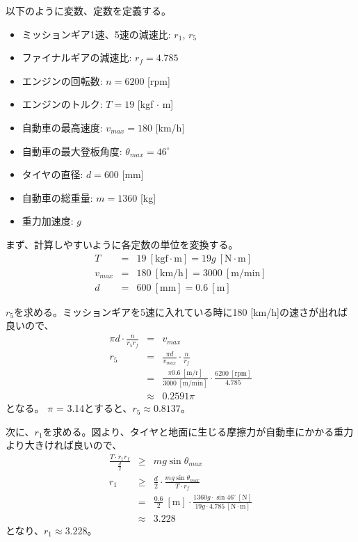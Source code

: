 \documentclass[titlepage]{jsarticle}
\begin{document}
以下のように変数、定数を定義する。
\begin{itemize}
  \item ミッションギア1速、5速の減速比: $r_1$, $r_5$
  \item ファイナルギアの減速比: $r_f = 4.785$
  \item エンジンの回転数: $n = 6200$ [rpm]
  \item エンジンのトルク: $T = 19$ [kgf $\cdot$ m]
  \item 自動車の最高速度: $v_{max} = 180$ [km/h]
  \item 自動車の最大登板角度: $\theta_{max} = 46^\circ$
  \item タイヤの直径: $d = 600$ [mm]
  \item 自動車の総重量: $m = 1360$ [kg]
  \item 重力加速度: $g$
\end{itemize}

まず、計算しやすいように各定数の単位を変換する。
\begin{eqnarray*}
  T &=& 19 \ [\mathrm{kgf \cdot m}] = 19g \ [\mathrm{N \cdot m}] \\
  v_{max} &=& 180 \ [\mathrm{km/h}] = 3000 \ [\mathrm{m/min}] \\
  d &=& 600 \ [\mathrm{mm}] = 0.6 \ [\mathrm m]
\end{eqnarray*}

$r_5$を求める。ミッションギアを5速に入れている時に180 [km/h]の速さが出れば良いので、
\begin{eqnarray*}
  \pi d \cdot \frac{n}{r_5r_f} &=& v_{max} \\
  r_5 &=& \frac{\pi d}{v_{max}} \cdot \frac{n}{r_f} \\
  &=& \frac{\pi 0.6 \ [\mathrm{m/r}]}{3000 \ [\mathrm{m/min}]} \cdot \frac{6200 \ [\mathrm{rpm}]}{4.785} \\
  &\approx& 0.2591 \pi
\end{eqnarray*}
となる。
$\pi$ = 3.14とすると、$r_5 \approx 0.8137$。

次に、$r_1$を求める。図より、タイヤと地面に生じる摩擦力が自動車にかかる重力より大きければ良いので、
\begin{eqnarray*}
  \frac{T \cdot r_1r_f}{\frac{d}{2}} &\geq& mg\sin \theta_{max} \\
  r_1 &\geq& \frac{d}{2} \cdot \frac{mg\sin \theta_{max}}{T \cdot r_f} \\
  &=& \frac{0.6}{2} \ [\mathrm m] \cdot \frac{1360g \cdot \sin 46^\circ \ [\mathrm N]}{19g \cdot 4.785 \ [\mathrm{N \cdot m}]} \\
  &\approx& 3.228
\end{eqnarray*}
となり、$r_1 \approx 3.228$。
\end{document}
